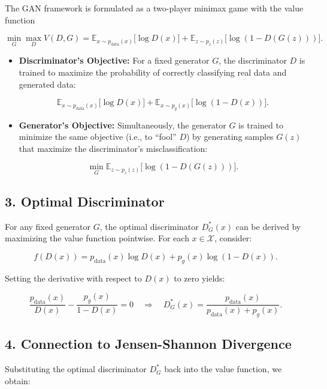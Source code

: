\documentclass{article}
\begin{document}
The GAN framework is formulated as a two-player minimax game with the value function

\[
\min_{G} \max_{D} V(D,G) = \mathbb{E}_{x\sim p_{\text{data}}(x)}\big[\log D(x)\big] + \mathbb{E}_{z\sim p_z(z)}\big[\log (1 - D(G(z)))\big].
\]

\begin{itemize}
    \item \textbf{Discriminator’s Objective:}
    For a fixed generator $ G $, the discriminator $ D $ is trained to maximize the probability of correctly classifying real data and generated data:

    \[
    \mathbb{E}_{x\sim p_{\text{data}}(x)}\big[\log D(x)\big] + \mathbb{E}_{x\sim p_g(x)}\big[\log (1 - D(x))\big].
    \]

    \item \textbf{Generator’s Objective:}
    Simultaneously, the generator $ G $ is trained to minimize the same objective (i.e., to “fool” $ D $) by generating samples $ G(z) $ that maximize the discriminator's misclassification:

    \[
    \min_{G} \mathbb{E}_{z\sim p_z(z)}\big[\log (1 - D(G(z)))\big].
    \]
\end{itemize}

\subsection*{3. Optimal Discriminator}

For any fixed generator $ G $, the optimal discriminator $ D^*_G(x) $ can be derived by maximizing the value function pointwise. For each $ x \in \mathcal{X} $, consider:

\[
f(D(x)) = p_{\text{data}}(x) \log D(x) + p_g(x) \log (1 - D(x)).
\]

Setting the derivative with respect to $ D(x) $ to zero yields:

\begin{equation}
\frac{p_{\text{data}}(x)}{D(x)} - \frac{p_g(x)}{1-D(x)} = 0 \quad \Longrightarrow \quad D^*_G(x) = \frac{p_{\text{data}}(x)}{p_{\text{data}}(x) + p_g(x)}.
\end{equation}

\subsection*{4. Connection to Jensen-Shannon Divergence}

Substituting the optimal discriminator $ D^*_G $ back into the value function, we obtain:
\end{document}
